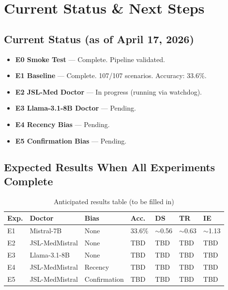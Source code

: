 \documentclass[12pt, a4paper]{article}
\begin{document}
\section{Current Status \& Next Steps}

\subsection{Current Status (as of April 17, 2026)}

\begin{itemize}
    \item[\textcolor{successpink}{\checkmark}] \textbf{E0 Smoke Test} — Complete. Pipeline validated.
    \item[\textcolor{successpink}{\checkmark}] \textbf{E1 Baseline} — Complete. 107/107 scenarios. Accuracy: 33.6\%.
    \item[$\rightarrow$]                        \textbf{E2 JSL-Med Doctor} — In progress (running via watchdog).
    \item[$\circ$]                              \textbf{E3 Llama-3.1-8B Doctor} — Pending.
    \item[$\circ$]                              \textbf{E4 Recency Bias} — Pending.
    \item[$\circ$]                              \textbf{E5 Confirmation Bias} — Pending.
\end{itemize}

\subsection{Expected Results When All Experiments Complete}

\begin{table}[H]
\centering
\caption{Anticipated results table (to be filled in)}
\label{tab:results_full}
\begin{tabular}{@{}lllllll@{}}
\toprule
\textbf{Exp.} & \textbf{Doctor} & \textbf{Bias} & \textbf{Acc.} & \textbf{DS} & \textbf{TR} & \textbf{IE} \\
\midrule
E1 & Mistral-7B     & None         & 33.6\% & $\sim$0.56 & $\sim$0.63 & $\sim$1.13 \\
E2 & JSL-MedMistral & None         & TBD    & TBD & TBD & TBD \\
E3 & Llama-3.1-8B   & None         & TBD    & TBD & TBD & TBD \\
E4 & JSL-MedMistral & Recency      & TBD    & TBD & TBD & TBD \\
E5 & JSL-MedMistral & Confirmation & TBD    & TBD & TBD & TBD \\
\bottomrule
\end{tabular}
\end{table}
\end{document}
